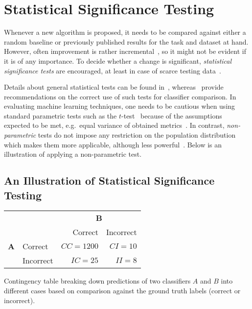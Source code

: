 \section{Statistical Significance Testing}

Whenever a new algorithm is proposed, it needs to be compared against either a random baseline or previously published results for the task and dataset at hand.
However, often improvement is rather incremental~\citep{Hand2006}, so it might not be evident if it is of any importance.
To decide whether a change is significant, \emph{statistical significance tests} are encouraged, at least in case of scarce testing data~\citep{Drummond2010}.

Details about general statistical tests can be found in~\citep{Urdan2011}, whereas~\citet{Japkowic2011} provide recommendations on the correct use of such tests for classifier comparison.
In evaluating machine learning techniques, one needs to be cautious when using standard parametric tests such as the $t$-test~\citep{Urdan2011} because of the assumptions expected to be met, e.g.\ equal variance of obtained metrics~\citep{Japkowic2011}. In contrast, \emph{non-parametric} tests do not impose any restriction on the population distribution which makes them more applicable, although less powerful~\citep{Colquhoun1971}.
%
Below is an illustration of applying a non-parametric test.

\subsection{An Illustration of Statistical Significance Testing}
\begin{margintable}
    \begin{tabular}{llrr}
        \toprule
        & & \multicolumn{2}{c}{\textbf{B}} \\
        & & Correct & Incorrect \\ \midrule
        \textbf{A} & Correct & $CC = 1200$ & $CI = 10$ \\
        & Incorrect & $IC = 25$   & $II = 8$  \\
        \bottomrule
    \end{tabular}
    \caption{Contingency table breaking down predictions of two classifiers $A$ and $B$ into different cases based on comparison against the ground truth labels (correct or incorrect).}
    \label{tab:eval-mcnemar-table}
\end{margintable}

